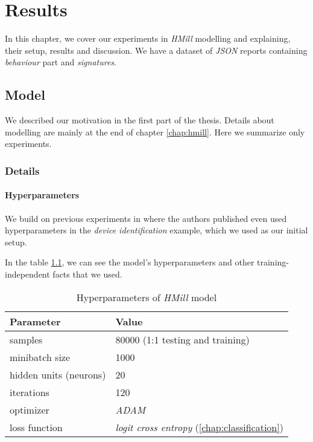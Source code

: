 \chapter{Results} \label{chap:results}
In this chapter, we cover our experiments in \emph{HMill} modelling and explaining, their setup, results and discussion. We have a dataset of \emph{JSON} reports containing \emph{behaviour} part and \emph{signatures}.

\section{Model}
We described our motivation in the first part of the thesis. Details about modelling are mainly at the end of chapter \ref{chap:hmill}. Here we summarize only experiments.

\subsection{Details}
\subsubsection{Hyperparameters}
We build on previous experiments in \cite{Mandlik2020} where the authors published even used hyperparameters in the \emph{device identification} example, which we used as our initial setup.

In the table \ref{tab:hyperparams}, we can see the model's hyperparameters and other training-independent facts that we used.

\begin{table}[h]
  \centering
  \caption{Hyperparameters of \emph{HMill} model}
  \begin{tabular}{p{6cm}p{8cm}} 
      \toprule
      \textbf{Parameter} &
      \textbf{Value} \\
      \midrule
      samples & 80000 (1:1 testing and training) \\
      \midrule
      minibatch size & 1000 \\
      \midrule
      hidden units (neurons) & 20\\
      \midrule
      iterations & 120\\
      \midrule
      optimizer & \emph{ADAM} \cite{Kingma2014}\\
      \midrule
      loss function & \emph{logit cross entropy} (\ref{chap:classification})\\
      \bottomrule
  \end{tabular}
  \label{tab:hyperparams}
\end{table}


